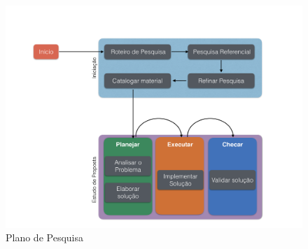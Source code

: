 \graphicspath{{figuras/}}
\begin{figure}[!htb]
\centering
\includegraphics[scale=0.5]{TCCMetodologia}
\caption{Plano de Pesquisa}
\label{Rotulo}
\end{figure}
